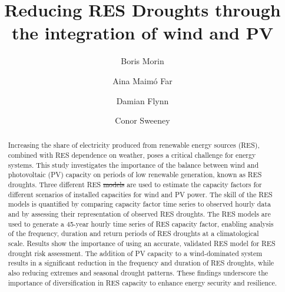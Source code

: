 \documentclass[preprint, 12pt]{elsarticle}
\providecommand{\DIFadd}[1]{{\protect\color{blue}\uwave{#1}}} %
\providecommand{\DIFdel}[1]{{\protect\color{red}\sout{#1}}}                      %
\providecommand{\DIFaddbegin}{} %
\providecommand{\DIFaddend}{} %
\providecommand{\DIFdelbegin}{} %
\providecommand{\DIFdelend}{} %
\begin{document}
\begin{frontmatter}


\title{Reducing RES Droughts through the integration of wind and \DIFaddbegin \DIFadd{solar }\DIFaddend PV}

\author[Math]{Boris Morin }

\author[Math]{Aina Maimó Far}

\author[Eng]{Damian Flynn}

\author[Math]{Conor Sweeney}




\begin{abstract}
Increasing the share of electricity produced from renewable energy sources (RES), combined with RES dependence on weather, poses a critical challenge for energy systems. This study investigates the importance of the balance between wind and \DIFaddbegin \DIFadd{solar }\DIFaddend photovoltaic (PV) capacity on periods of low renewable generation, known as RES droughts. Three different RES \DIFdelbegin \DIFdel{models }\DIFdelend \DIFaddbegin \DIFadd{datasets }\DIFaddend are used to estimate the capacity factors for different scenarios of installed capacities for wind and \DIFaddbegin \DIFadd{solar }\DIFaddend PV power. The skill of the RES models is quantified by comparing capacity factor time series to observed hourly data and by assessing their representation of observed RES droughts. The RES models are used to generate a 45-year hourly time series of RES capacity factor, enabling analysis of the frequency, duration and return periods of RES droughts at a climatological scale. Results show the importance of using an accurate, validated RES model for RES drought risk assessment. The addition of \DIFaddbegin \DIFadd{solar }\DIFaddend PV capacity to a wind-dominated system results in a significant reduction in the frequency and duration of RES droughts, while also reducing extremes and seasonal \DIFaddbegin \DIFadd{RES }\DIFaddend drought patterns. These findings underscore the importance of diversification in RES capacity to enhance energy security and resilience.
\end{abstract}


\end{frontmatter}
\end{document}
